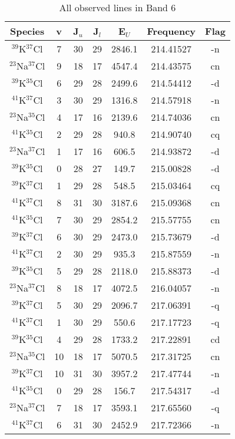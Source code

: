 \begin{table*}[htp]
\centering
\caption{All observed lines in Band 6}
\begin{tabular}{ccccccc}
\label{tab:all_detections_B6}
Species & v & J$_u$ & J$_l$ & E$_U$ & Frequency & Flag \\
\hline
$^{39}$K$^{37}$Cl & 7 & 30 & 29 & 2846.1 & 214.41527 & -n \\
$^{23}$Na$^{37}$Cl & 9 & 18 & 17 & 4547.4 & 214.43575 & cn \\
$^{39}$K$^{35}$Cl & 6 & 29 & 28 & 2499.6 & 214.54412 & -d \\
$^{41}$K$^{37}$Cl & 3 & 30 & 29 & 1316.8 & 214.57918 & -n \\
$^{23}$Na$^{35}$Cl & 4 & 17 & 16 & 2139.6 & 214.74036 & cn \\
$^{41}$K$^{35}$Cl & 2 & 29 & 28 & 940.8 & 214.90740 & cq \\
$^{23}$Na$^{37}$Cl & 1 & 17 & 16 & 606.5 & 214.93872 & -d \\
$^{39}$K$^{35}$Cl & 0 & 28 & 27 & 149.7 & 215.00828 & -d \\
$^{39}$K$^{37}$Cl & 1 & 29 & 28 & 548.5 & 215.03464 & cq \\
$^{41}$K$^{37}$Cl & 8 & 31 & 30 & 3187.6 & 215.09368 & cn \\
$^{41}$K$^{35}$Cl & 7 & 30 & 29 & 2854.2 & 215.57755 & cn \\
$^{39}$K$^{37}$Cl & 6 & 30 & 29 & 2473.0 & 215.73679 & -d \\
$^{41}$K$^{37}$Cl & 2 & 30 & 29 & 935.3 & 215.87559 & -n \\
$^{39}$K$^{35}$Cl & 5 & 29 & 28 & 2118.0 & 215.88373 & -d \\
$^{23}$Na$^{37}$Cl & 8 & 18 & 17 & 4072.5 & 216.04057 & -n \\
$^{39}$K$^{37}$Cl & 5 & 30 & 29 & 2096.7 & 217.06391 & -q \\
$^{41}$K$^{37}$Cl & 1 & 30 & 29 & 550.6 & 217.17723 & -q \\
$^{39}$K$^{35}$Cl & 4 & 29 & 28 & 1733.2 & 217.22891 & cd \\
$^{23}$Na$^{35}$Cl & 10 & 18 & 17 & 5070.5 & 217.31725 & cn \\
$^{39}$K$^{37}$Cl & 10 & 31 & 30 & 3957.2 & 217.47744 & -n \\
$^{41}$K$^{35}$Cl & 0 & 29 & 28 & 156.7 & 217.54317 & -d \\
$^{23}$Na$^{37}$Cl & 7 & 18 & 17 & 3593.1 & 217.65560 & -q \\
$^{41}$K$^{37}$Cl & 6 & 31 & 30 & 2452.9 & 217.72366 & -n \\

\end{tabular}
\end{table*}
